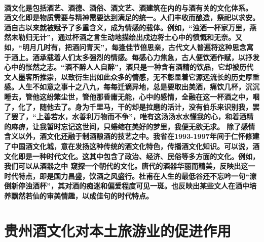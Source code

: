 \documentclass[12pt,a4paper]{ctexart} %
\begin{document}
\paragraph{\textnormal{酒文化是包括酒艺、酒德、酒俗、酒文艺、酒建筑在内的与酒有关的文化体系\cite{culture}。\newline 　　 酒文化即是物质需要与精神需要达到满足的统一。人们丰收而酿造，祭祀以求安。酒自古以来就被赋予了多重含义，成为情感的载体。例如，“浊酒一杯家万里，燕然未勒归无计”，通过杯酒之言生动地描绘出戍边将士心中的愤慨和无奈。又如，“明月几时有，把酒问青天”，每逢佳节倍思亲，古代文人普遍将这种思念寓于酒上。酒承载着人们太多强烈的情感。每感心力焦急，古人便饮酒作赋，以抒发心中的怅然之志。“酒不醉人人自醉”，酒只是一种含有酒精的饮品，它却被历代文人墨客所推崇，以致衍生出如此众多的情感，无不彰显着它源远流长的历史厚重感。人生不如意之事十之八九，每每迁谪异地，总是要取出美酒，痛饮几杯，沉沉睡去，管他这纷繁尘世，管他那昏庸无能，心中的感情，全融在这一杯酒之中，咽了，化了，随他去了。身为千里马，干的却是拉磨的活计，没有伯乐来识别我，罢了罢了，“上善若水，水善利万物而不争”，唯有这汤汤水水懂我的心，和着酒精的麻痹，让我暂时忘记这世间，只蜷缩在美好的梦里，我便无欲无求。
除了感情含义以外，酒文化还融于制酒酿酒的技艺之中。我省在1993-1997年间于仁怀修建了中国酒文化城，意在发扬这种传统的酒文化特色，传播酒文化知识。可以说，酒文化即是一种时代文化。这其中包含了政治、经济、民俗等多方面的文化。例如，我们可以从酒器之中 \cite{tool} 窥探一个朝代的文化。唐代的酒器华丽而精美，反映出这一时代特点，即是国力昌盛，饮酒之风盛行。杜甫在人生的最低谷还不忘吟一句“潦倒新停浊酒杯”，其对酒的痴迷和偏爱程度可见一斑。也反映出某些文人在酒中培养飘然若仙的审美情趣，以成佳句的时代特点。}}
\section{贵州酒文化对本土旅游业的促进作用}
\end{document}
